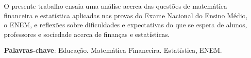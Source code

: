 
\setlength{\absparsep}{18pt} %
\begin{resumo}
 O presente trabalho ensaia uma análise acerca das questões de matemática financeira e estatística aplicadas nas provas do Exame Nacional do Ensino Médio, o ENEM, e reflexões sobre dificuldades e expectativas do que se espera de alunos, professores e sociedade acerca de finanças e estatísticas. 

  \vspace{\onelineskip}

 \textbf{Palavras-chave}: Educação. Matemática Financeira. Estatística, ENEM.
\end{resumo}
